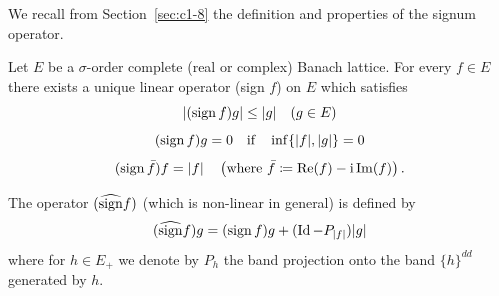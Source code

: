 We recall from Section~\ref{sec:c1-8} the definition and properties of the signum operator.
\begin{proposition}\label{prop:c2-2.1}
%
Let $E$ be a $\sigma$-order complete (real or complex) Banach lattice.
For every $f \in E$ there exists a unique linear operator (sign $f$) on $E$ which satisfies
\begin{equation}\label{eq:c2-2.1}
	|(\sign f)g| \leq |g| \quad (g \in E)
\end{equation}
\begin{equation}\label{eq:c2-2.2}
(\operatorname{sign} f)g = 0 \quad \text{if} \quad \inf\{|f|,|g|\} = 0
\end{equation}
\begin{equation}\label{eq:c2-2.3}
(\operatorname{sign} \bar{f})f = |f| \quad \left(\text{where } \bar{f} \coloneq \mathop{}\!\mathrm{Re}(f) - \mathrm{i}\mathop{}\!\mathrm{Im}(f) \right) .
\end{equation}
\end{proposition}
The operator $(\widehat{\operatorname{sign}} f)$ (which is non-linear in general) is defined by
\begin{equation}\label{eq:c2-2.4}
(\widehat{\operatorname{sign}}f)g = (\operatorname{sign} f)g + (\operatorname{Id} - P_{|f|})|g|
\end{equation}
where for $h \in E_{+}$ we denote by $P_h$ the band projection onto the band $\{h\}^{dd}$ generated by $h$.

